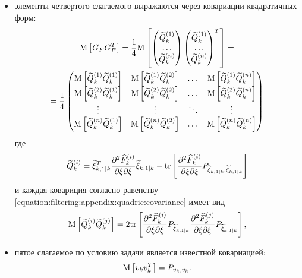 \begin{itemize}
    \item элементы четвертого слагаемого выражаются через ковариации квадратичных форм:
        \begin{multline*}
            \mathrm{M} \left [ G_F G_F^T \right ]
                = \frac{1}{4}
                    \mathrm{M} \left [ 
                        \begin{pmatrix}
                            \widetilde{Q}_{k}^{(1)} \\
                            \dots \\
                            \widetilde{Q}_{k}^{(n)}
                        \end{pmatrix}
                        \begin{pmatrix}
                            \widetilde{Q}_{k}^{(1)} \\
                            \dots \\
                            \widetilde{Q}_{k}^{(n)}
                        \end{pmatrix}^T
                     \right ] = \\
            = \frac{1}{4}
                \begin{pmatrix}
                    \mathrm{M} \left [ \widetilde{Q}_{k}^{(1)} \widetilde{Q}_{k}^{(1)} \right ] & \mathrm{M} \left [ \widetilde{Q}_{k}^{(1)} \widetilde{Q}_{k}^{(2)} \right ] & \dots  & \mathrm{M} \left [ \widetilde{Q}_{k}^{(1)} \widetilde{Q}_{k}^{(n)} \right ] \\
                    \mathrm{M} \left [ \widetilde{Q}_{k}^{(2)} \widetilde{Q}_{k}^{(1)} \right ] & \mathrm{M} \left [ \widetilde{Q}_{k}^{(2)} \widetilde{Q}_{k}^{(2)} \right ] & \dots  & \mathrm{M} \left [ \widetilde{Q}_{k}^{(2)} \widetilde{Q}_{k}^{(n)} \right ] \\
                    \vdots                                                        & \vdots                                                        & \ddots & \vdots \\
                    \mathrm{M} \left [ \widetilde{Q}_{k}^{(n)} \widetilde{Q}_{k}^{(1)} \right ] & \mathrm{M} \left [ \widetilde{Q}_{k}^{(n)} \widetilde{Q}_{k}^{(2)} \right ] & \dots  & \mathrm{M} \left [ \widetilde{Q}_{k}^{(n)} \widetilde{Q}_{k}^{(n)} \right ]
                \end{pmatrix}
        \end{multline*}
        где
        $$
            \widetilde{Q}_{k}^{(i)} = \widetilde{\xi}_{k,1|k}^T \frac{\partial^2 \widehat{F}_k^{(i)}}{{\partial \xi}{\partial \xi}} \widetilde{\xi}_{k,1|k} - \mathrm{tr} \left [ \frac{\partial^2 \widehat{F}_k^{(i)}}{{\partial \xi}{\partial \xi}} P_{\widetilde{\xi}_{k,1|k}, \widetilde{\xi}_{k,1|k}} \right ]
        $$
        и каждая ковариция согласно равенству \eqref{equation:filtering:appendix:quadric:covariance} имеет вид
        $$
            \mathrm{M} \left [ \widetilde{Q}_{k}^{(i)} \widetilde{Q}_{k}^{(j)} \right ] = 2 \mathrm{tr} \left [ \frac{\partial^2 \widehat{F}_k^{(i)}}{{\partial \xi}{\partial \xi}} P_{\widetilde{\xi}_{k,1|k}} \frac{\partial^2 \widehat{F}_k^{(j)}}{{\partial \xi}{\partial \xi}} P_{\widetilde{\xi}_{k,1|k}} \right ]
            ,
        $$

    \item пятое слагаемое по условию задачи является известной ковариацией:
        $$
            \mathrm{M} \left [ v_k v_k^T \right ] = P_{v_k, v_k}
            .
        $$
\end{itemize}

